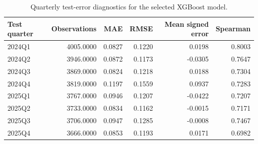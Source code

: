 \begin{table}
\caption{Quarterly test-error diagnostics for the selected XGBoost model.}
\label{tab:xgboost-quarterly-test-errors}
\begin{tabular}{lrrrrr}
\toprule
Test quarter & Observations & MAE & RMSE & Mean signed error & Spearman \\
\midrule
2024Q1 & 4005.0000 & 0.0827 & 0.1220 & 0.0198 & 0.8003 \\
2024Q2 & 3946.0000 & 0.0872 & 0.1173 & -0.0305 & 0.7647 \\
2024Q3 & 3869.0000 & 0.0824 & 0.1218 & 0.0188 & 0.7304 \\
2024Q4 & 3819.0000 & 0.1197 & 0.1559 & 0.0937 & 0.7283 \\
2025Q1 & 3767.0000 & 0.0946 & 0.1207 & -0.0422 & 0.7207 \\
2025Q2 & 3733.0000 & 0.0834 & 0.1162 & -0.0015 & 0.7171 \\
2025Q3 & 3706.0000 & 0.0947 & 0.1285 & -0.0008 & 0.7467 \\
2025Q4 & 3666.0000 & 0.0853 & 0.1193 & 0.0171 & 0.6982 \\
\bottomrule
\end{tabular}
\end{table}
